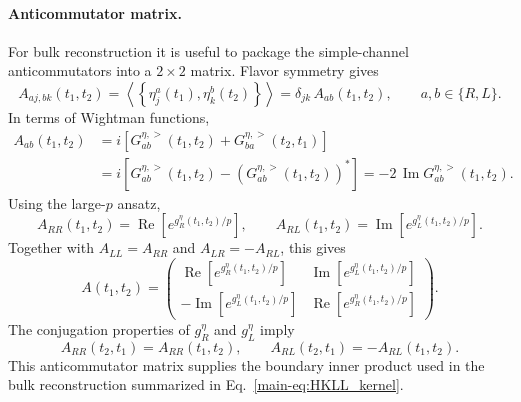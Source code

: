 \documentclass[11pt,a4paper]{article}
\begin{document}
\paragraph*{Anticommutator matrix.}
For bulk reconstruction it is useful to package the simple-channel
anticommutators into a \(2\times2\) matrix.  Flavor symmetry gives
\begin{equation}
\label{eq:S3-anticommutator-flavor}
  A_{aj,bk}(t_1,t_2)
  =
  \left\langle
  \left\{
  \eta^a_j(t_1),\eta^b_k(t_2)
  \right\}
  \right\rangle
  =
  \delta_{jk}\,A_{ab}(t_1,t_2),
  \qquad
  a,b\in\{R,L\}.
\end{equation}
In terms of Wightman functions,
\begin{equation}
\label{eq:S3-anticommutator-wightman}
\begin{aligned}
  A_{ab}(t_1,t_2)
  &=
  i\left[
  G^{\eta,>}_{ab}(t_1,t_2)
  +
  G^{\eta,>}_{ba}(t_2,t_1)
  \right]
  \\
  &=
  i\left[
  G^{\eta,>}_{ab}(t_1,t_2)
  -
  \left(G^{\eta,>}_{ab}(t_1,t_2)\right)^*
  \right]
  =
  -2\,\operatorname{Im}G^{\eta,>}_{ab}(t_1,t_2).
\end{aligned}
\end{equation}
Using the large-\(p\) ansatz,
\begin{equation}
\label{eq:S3-anticommutator-components}
  A_{RR}(t_1,t_2)
  =
  \operatorname{Re}\left[
  e^{g^\eta_R(t_1,t_2)/p}
  \right],
  \qquad
  A_{RL}(t_1,t_2)
  =
  \operatorname{Im}\left[
  e^{g^\eta_L(t_1,t_2)/p}
  \right].
\end{equation}
Together with \(A_{LL}=A_{RR}\) and \(A_{LR}=-A_{RL}\), this gives
\begin{equation}
\label{eq:S3-anticommutator-matrix}
  A(t_1,t_2)
  =
  \begin{pmatrix}
    \operatorname{Re}\left[e^{g^\eta_R(t_1,t_2)/p}\right]
    &
    \operatorname{Im}\left[e^{g^\eta_L(t_1,t_2)/p}\right]
    \\
    -\operatorname{Im}\left[e^{g^\eta_L(t_1,t_2)/p}\right]
    &
    \operatorname{Re}\left[e^{g^\eta_R(t_1,t_2)/p}\right]
  \end{pmatrix}.
\end{equation}
The conjugation properties of \(g^\eta_R\) and \(g^\eta_L\) imply
\begin{equation}
\label{eq:S3-anticommutator-symmetry}
  A_{RR}(t_2,t_1)=A_{RR}(t_1,t_2),
  \qquad
  A_{RL}(t_2,t_1)=-A_{RL}(t_1,t_2).
\end{equation}
This anticommutator matrix supplies the boundary inner product used in the
bulk reconstruction summarized in Eq.~\eqref{main-eq:HKLL_kernel}.
\end{document}
